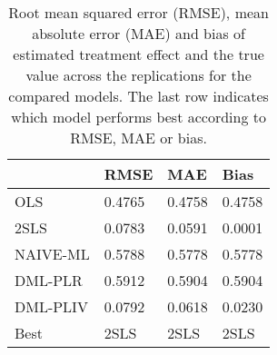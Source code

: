 \begin{table}[H]
\centering
\caption{Root mean squared error (RMSE), mean absolute error (MAE) and bias of estimated treatment effect and the true value across the replications for the compared models. The last row indicates which model performs best according to RMSE, MAE or bias.}
\label{Scenario3}
\begin{tabular}{L{3.3333333333333335cm}L{2.6666666666666665cm}R{2.0cm}R{2.6666666666666665cm}}
\toprule
 & RMSE & MAE & Bias \\
\midrule
OLS & 0.4765 & 0.4758 & 0.4758 \\
2SLS & 0.0783 & 0.0591 & 0.0001 \\
NAIVE-ML & 0.5788 & 0.5778 & 0.5778 \\
DML-PLR & 0.5912 & 0.5904 & 0.5904 \\
DML-PLIV & 0.0792 & 0.0618 & 0.0230 \\
Best & 2SLS & 2SLS & 2SLS \\
\bottomrule
\end{tabular}
\end{table}
